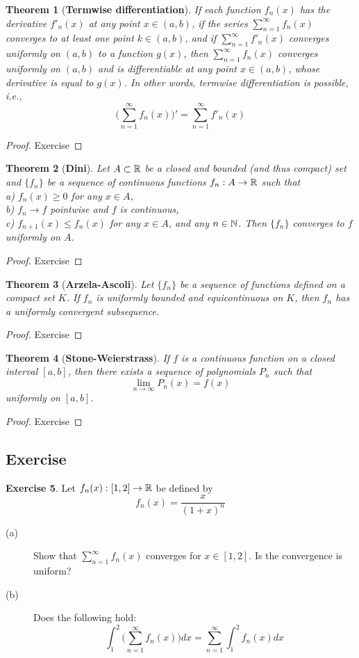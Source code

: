 \documentclass[	DIV=calc,paper=a4,fontsize=11pt]{scrartcl}	 	%
\newtheorem{thm}{Theorem}[section]
\theoremstyle{definition}
\newtheorem{exer}[thm]{Exercise}
\theoremstyle{plain}
\theoremstyle{remark}
\begin{document}
\begin{thm}[\textbf{Termwise differentiation}]
If each function $f_n(x)$ has the derivative $f'_n(x)$ at any point $x\in (a, b)$, if the series $\sum_{n=1}^{\infty}f_n(x)$ converges to at least one point $k\in (a, b)$, and if $\sum_{n=1}^{\infty}f'_n(x)$ converges uniformly on $(a, b)$ to a function $g(x)$, then $\sum_{n=1}^{\infty}f_n(x)$ converges uniformly on $(a, b)$ and is differentiable at any point $x\in (a, b)$, whose derivative is equal to $g(x)$. In other words, termwise differentiation is possible, i.e.,
\[\biggl(\sum_{n=1}^{\infty}f_n(x)\biggl)'=\sum_{n=1}^{\infty}f'_n(x)\]
\end{thm}
\begin{proof}
Exercise
\end{proof}

\begin{thm}[\textbf{Dini}]
Let $A \subset \Bbb R$ be a closed and bounded (and thus compact) set and $\{f_n\}$ be a sequence of continuous functions $f_n : A\to \Bbb R$ such that\\
a) $f_n(x) \geq 0$ for any $x\in A$,\\
b) $f_n\to f$ pointwise and $f$ is continuous,\\
c) $f_{n+1}(x) \leq f_n(x)$ for any $x \in A$, and any $n \in \Bbb N$.
Then $\{f_n\}$ converges to $f$ uniformly on $A$.
\end{thm}

\begin{proof}
Exercise
\end{proof}
\begin{thm}[\textbf{Arzela-Ascoli}]
Let $\{f_n\}$ be a sequence of functions defined on a compact set $K$. If $f_n$ is uniformly bounded and equicontinuous on $K$, then $f_n$ has a uniformly convergent subsequence.
\end{thm}
\begin{proof}
Exercise
\end{proof}

\begin{thm}[\textbf{Stone-Weierstrass}]
If $f$ is a continuous function on a closed interval $[a, b]$, then there exists a sequence of polynomials $P_n$ such that
$$\lim_{n\to\infty}P_n(x) = f(x)$$
uniformly on $[a, b]$.
\end{thm}
\begin{proof}
Exercise
\end{proof}

\newpage
\subsection{Exercise}
\begin{exer}\label{061}
Let $f_n(x) : [1, 2] \to \Bbb R$ be defined by
\[
f_n(x) = \frac{x}{(1 + x)^n}
\]
\begin{description}
  \item[(a)] Show that $\sum_{n=1}^{\infty}f_n(x)$ converges for $x\in [1, 2]$. Is the convergence is uniform?
  \item[(b)] Does the following hold:
   \[\int_{1}^{2}\biggl(\sum_{n=1}^{\infty}f_n(x)\biggl)dx=\sum_{n=1}^{\infty}\int_{1}^{2}f_n(x)dx\]
\end{description}
\end{exer}
\end{document}
